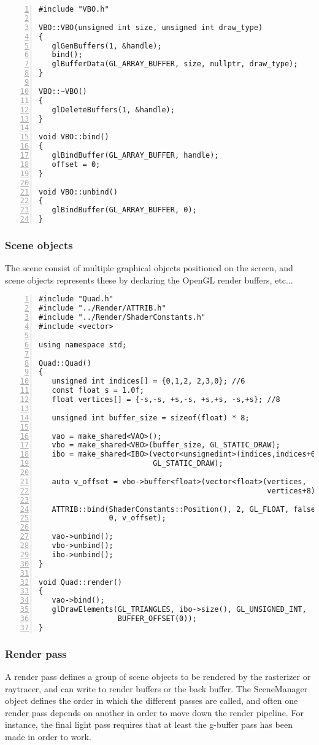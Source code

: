 \begin{Verbatim}[frame=single, numbers=left, label=VBO implementation]
#include "VBO.h"

VBO::VBO(unsigned int size, unsigned int draw_type)
{
   glGenBuffers(1, &handle);
   bind();
   glBufferData(GL_ARRAY_BUFFER, size, nullptr, draw_type);
}

VBO::~VBO()
{
   glDeleteBuffers(1, &handle);
}

void VBO::bind()
{
   glBindBuffer(GL_ARRAY_BUFFER, handle);
   offset = 0;
}

void VBO::unbind()
{
   glBindBuffer(GL_ARRAY_BUFFER, 0);
}
\end{Verbatim}

\subsubsection{Scene objects}
The scene consist of multiple graphical objects positioned on the screen, and scene objects represents these by declaring the OpenGL render buffers, etc...

\begin{Verbatim}[frame=single, numbers=left, label=Fullscreen quad implementation]
#include "Quad.h"
#include "../Render/ATTRIB.h"
#include "../Render/ShaderConstants.h"
#include <vector>

using namespace std;

Quad::Quad()
{
   unsigned int indices[] = {0,1,2, 2,3,0}; //6
   const float s = 1.0f;
   float vertices[] = {-s,-s, +s,-s, +s,+s, -s,+s}; //8

   unsigned int buffer_size = sizeof(float) * 8;

   vao = make_shared<VAO>();
   vbo = make_shared<VBO>(buffer_size, GL_STATIC_DRAW);
   ibo = make_shared<IBO>(vector<unsignedint>(indices,indices+6),
                          GL_STATIC_DRAW);

   auto v_offset = vbo->buffer<float>(vector<float>(vertices, 
                                                    vertices+8));

   ATTRIB::bind(ShaderConstants::Position(), 2, GL_FLOAT, false, 
                0, v_offset);

   vao->unbind();
   vbo->unbind();
   ibo->unbind();
}

void Quad::render()
{
   vao->bind();
   glDrawElements(GL_TRIANGLES, ibo->size(), GL_UNSIGNED_INT, 
                  BUFFER_OFFSET(0));
}
\end{Verbatim}

\subsubsection{Render pass}
A render pass defines a group of scene objects to be rendered by the rasterizer or raytracer, and can write to render buffers or the back buffer. The SceneManager object defines the order in which the different passes are called, and often one render pass depends on another in order to move down the render pipeline. For instance, the final light pass requires that at least the g-buffer pass has been made in order to work.

